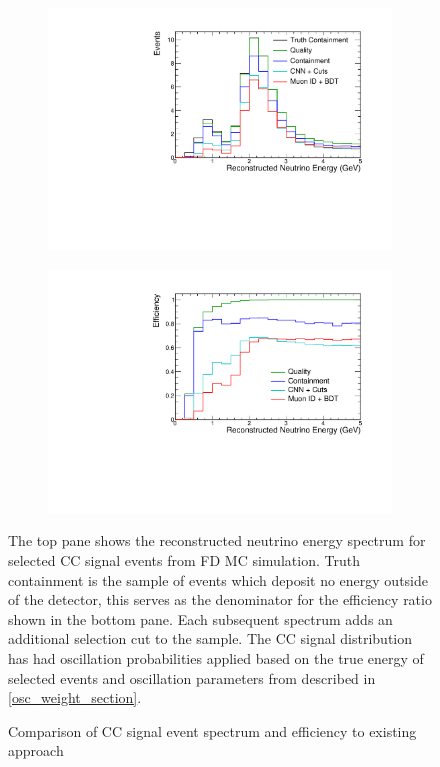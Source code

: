 \begin{figure}
\vspace{-30pt}
\begin{center}
  \begin{subfigure}[b]{0.7\textwidth}
    \centering
    \includegraphics[width=\textwidth]{figures/selection/cosmic_sig_osc.pdf}
  \end{subfigure}

  \begin{subfigure}[b]{0.7\textwidth}
    \centering
    \includegraphics[width=\textwidth]{figures/selection/cosmic_sig_eff_osc.pdf}
  \end{subfigure}

\end{center}
\vspace{-10pt}
\caption{Comparison of \numu CC signal event spectrum and efficiency to
existing approach}{
The top pane shows the reconstructed neutrino energy spectrum
for selected \numu CC signal events from FD MC simulation.
Truth containment is the sample of events which deposit
no energy outside of the detector, this serves as the denominator
for the efficiency ratio shown in the bottom pane.
Each subsequent spectrum adds an additional selection cut to the sample.
The \numu CC signal distribution has had oscillation probabilities applied
based on the true energy of selected events and oscillation parameters
from described in \ref{osc_weight_section}.

}
\end{figure}
